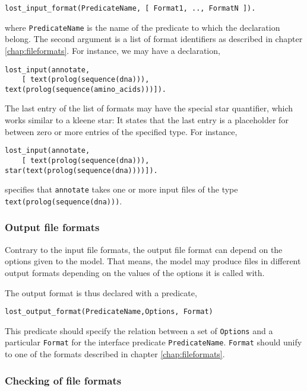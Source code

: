 \documentclass{book}
\begin{document}
\begin{verbatim}
lost_input_format(PredicateName, [ Format1, .., FormatN ]).
\end{verbatim}

\noindent
where \texttt{PredicateName} is the name of the predicate to which 
the declaration belong. The second argument is a list of format 
identifiers as described in chapter \ref{chap:fileformats}.
For instance, we may have a declaration,
\begin{verbatim}
lost_input(annotate, 
    [ text(prolog(sequence(dna))), text(prolog(sequence(amino_acids)))]).
\end{verbatim}

The last entry of the list of formats may have the special star quantifier, which works 
similar to a kleene star: It states that the last entry is a placeholder for between zero or more entries of the specified type. For instance,
\begin{verbatim}
lost_input(annotate, 
    [ text(prolog(sequence(dna))), star(text(prolog(sequence(dna))))]).
\end{verbatim}
\noindent
specifies that \texttt{annotate} takes one or more input files of the type \texttt{text(prolog(sequence(dna)))}.

\subsubsection{Output file formats}

Contrary to the input file formats, the output file format can depend on the options given 
to the model. That means, the model may produce files in different output formats depending 
on the values of the options it is called with.

The output format is thus declared with a predicate, 
\begin{verbatim}
lost_output_format(PredicateName,Options, Format)
\end{verbatim}

\noindent
This predicate should specify the relation between a set of \texttt{Options} and a particular \texttt{Format} for the interface predicate \texttt{PredicateName}.
\texttt{Format} should unify to one of the formats described in
chapter \ref{chap:fileformats}.

\subsubsection{Checking of file formats}
\end{document}
